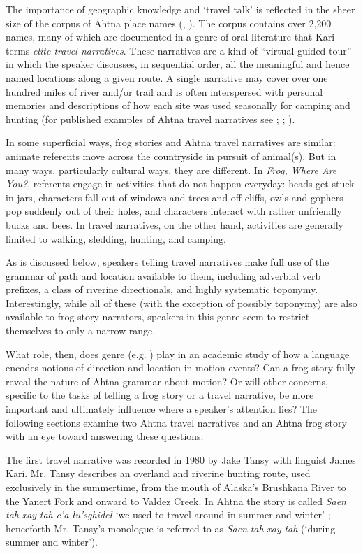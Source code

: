 The importance of geographic knowledge and ‘travel talk’ is reflected in the sheer size of the corpus of Ahtna place names (\citealt{Kari1982}, \citeyear{Kari2008}). The corpus contains over 2,200 names, many of which are documented in a genre of oral literature that Kari terms \textit{elite travel narratives}. These narratives are a kind of “virtual guided tour” in which the speaker discusses, in sequential order, all the meaningful and hence named locations along a given route. A single narrative may cover over one hundred miles of river and/or trail and is often interspersed with personal memories and descriptions of how each site was used seasonally for camping and hunting (for published examples of Ahtna travel narratives see \citealt{Kari1986}; \citealt{KariFall2003}; \citealt{Kari2010}).

In some superficial ways, frog stories and Ahtna travel narratives are similar: animate referents move across the countryside in pursuit of animal(s). But in many ways, particularly cultural ways, they are different. In \textit{Frog, Where Are You?}, referents engage in activities that do not happen everyday: heads get stuck in jars, characters fall out of windows and trees and off cliffs, owls and gophers pop suddenly out of their holes, and characters interact with rather unfriendly bucks and bees. In travel narratives, on the other hand, activities are generally limited to walking, sledding, hunting, and camping.

As is discussed below, speakers telling travel narratives make full use of the grammar of path and location available to them, including adverbial verb prefixes, a class of riverine directionals, and highly systematic toponymy. Interestingly, while all of these (with the exception of possibly toponymy) are also available to frog story narrators, speakers in this genre seem to restrict themselves to only a narrow range.

What role, then, does genre (e.g. \citealt{Mayes2003}) play in an academic study of how a language encodes notions of direction and location in motion events? Can a frog story fully reveal the nature of Ahtna grammar about motion? Or will other concerns, specific to the tasks of telling a frog story or a travel narrative, be more important and ultimately influence where a speaker’s attention lies? The following sections examine two Ahtna travel narratives and an Ahtna frog story with an eye toward answering these questions.

The first travel narrative was recorded in 1980 by Jake Tansy with linguist James Kari. Mr. Tansy describes an overland and riverine hunting route, used exclusively in the summertime, from the mouth of Alaska’s Brushkana River to the Yanert Fork and onward to Valdez Creek. In Ahtna the story is called \textit{Saen} \textit{tah} \textit{xay} \textit{tah} \textit{c’a} \textit{łu’sghideł} ‘we used to travel around in summer and winter’ \citep[59-69]{Kari2010}; henceforth Mr. Tansy’s monologue is referred to as \textit{Saen} \textit{tah} \textit{xay} \textit{tah}  (‘during summer and winter’).

